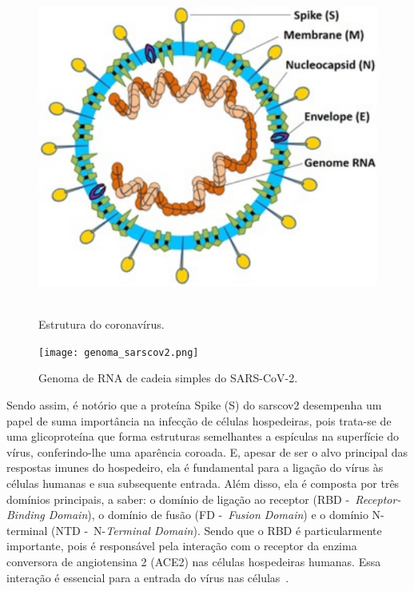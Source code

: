 \begin{figure}[htb]
  \centering
  \caption{Estrutura do coronavírus.}
  \includegraphics[scale=0.8]{figuras/estruturaSarsCov2.pdf}
  ~\label{fig:estruturaCoronavirus}
\end{figure}

\begin{figure}[htb]
  \centering
  \caption{Genoma de RNA de cadeia simples do SARS-CoV-2.}
  \texttt{[image: genoma\_sarscov2.png]}
  ~\label{fig:genomaCoronavirus}
\end{figure}

Sendo assim, é notório que a proteína Spike (S) do \gls{sarscov2} desempenha um papel de suma importância na infecção de células hospedeiras, pois trata-se de uma glicoproteína que forma estruturas semelhantes a espículas na superfície do vírus, conferindo-lhe uma aparência coroada. E, apesar de ser o alvo principal das respostas imunes do hospedeiro, ela é fundamental para a ligação do vírus às células humanas e sua subsequente entrada. Além disso, ela é composta por três domínios principais, a saber: o domínio de ligação ao receptor (RBD -~\textit{Receptor-Binding Domain}), o domínio de fusão (FD -~\textit{Fusion Domain}) e o domínio N-terminal (NTD -~N-\textit{Terminal Domain}). Sendo que o RBD é particularmente importante, pois é responsável pela interação com o receptor da enzima conversora de angiotensina 2 (ACE2) nas células hospedeiras humanas. Essa interação é essencial para a entrada do vírus nas células~\cite{covid19_cascella_2020}.

